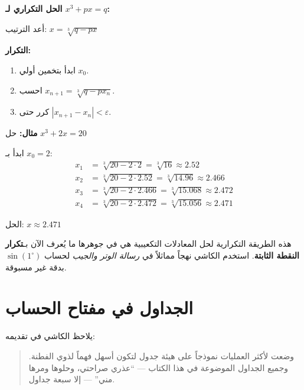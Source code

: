 \documentclass[11pt,a4paper]{book}
\newcommand{\ar}[1]{\arabicfont\beginR #1\endR}
\newenvironment{mathalgo}{%
  \par\vspace{0.3cm}
  \begin{framed}
  \setlength{\parindent}{0pt}
}{%
  \end{framed}
  \par\vspace{0.3cm}
}
\begin{document}
\begin{mathalgo}
\textbf{\ar{الحل التكراري لـ} $x^3 + px = q$:}

\ar{أعد الترتيب:} $x = \sqrt[3]{q - px}$

\vspace{0.3cm}
\textbf{\ar{التكرار:}}
\begin{enumerate}[nosep]
  \item \ar{ابدأ بتخمين أولي $x_0$.}
  \item \ar{احسب} $x_{n+1} = \sqrt[3]{q - p x_n}$.
  \item \ar{كرر حتى} $|x_{n+1} - x_n| < \varepsilon$.
\end{enumerate}

\vspace{0.3cm}
\noindent\textbf{\ar{مثال:}} \ar{حل} $x^3 + 2x = 20$

\ar{ابدأ بـ} $x_0 = 2$:
\begin{align*}
x_1 &= \sqrt[3]{20 - 2 \cdot 2} = \sqrt[3]{16} \approx 2.52 \\
x_2 &= \sqrt[3]{20 - 2 \cdot 2.52} = \sqrt[3]{14.96} \approx 2.466 \\
x_3 &= \sqrt[3]{20 - 2 \cdot 2.466} = \sqrt[3]{15.068} \approx 2.472 \\
x_4 &= \sqrt[3]{20 - 2 \cdot 2.472} = \sqrt[3]{15.056} \approx 2.471
\end{align*}

\ar{الحل:} $\boxed{x \approx 2.471}$
\end{mathalgo}

\noindent\ar{هذه الطريقة التكرارية لحل المعادلات التكعيبية هي في جوهرها ما يُعرف الآن بـ\textbf{تكرار النقطة الثابتة}. استخدم الكاشي نهجاً مماثلاً في \textit{رسالة الوتر والجيب} لحساب $\sin(1^\circ)$ بدقة غير مسبوقة.}
\clearpage

\chapter{\ar{الجداول في مفتاح الحساب}}
\label{ch:tables}

\noindent\ar{يلاحظ الكاشي في تقديمه:}
\begin{quote}
\ar{وضعت لأكثر العمليات نموذجاً على هيئة جدول لتكون أسهل فهماً لذوي الفطنة. وجميع الجداول الموضوعة في هذا الكتاب — ``عذري صراحتي، وحلوها ومرها مني'' — إلا سبعة جداول.}
\end{quote}
\end{document}
